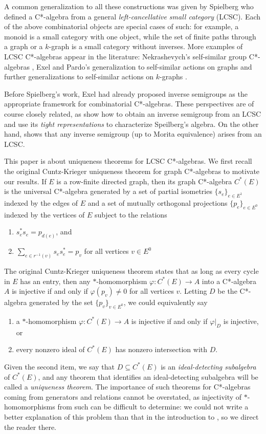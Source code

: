 \documentclass[12pt]{amsart}
\theoremstyle{definition}
\theoremstyle{remark}
\numberwithin{equation}{section}
\newcommand{\vp}{\varphi}
\begin{document}
 A common generalization to all these constructions was given by Spielberg \cite{Sp20} who defined a C*-algebra from a general {\em left-cancellative small category} (LCSC). Each of the above combinatorial objects are special cases of such: for example, a monoid is a small category with one object, while the set of finite paths through a graph or a $k$-graph is a small category without inverses. More examples of LCSC C*-algebras appear in the literature: Nekrashevych's self-similar group C*-algebras \cite{Nek09}, Exel and Pardo's generalization to self-similar actions on graphs \cite{EP17} and further generalizations to self-similar actions on $k$-graphs \cite{LY19,  LY21}.
 
 Before Spielberg's work, Exel \cite{Ex08} had already proposed inverse semigroups as the appropriate framework for combinatorial C*-algebras. These perspectives are of course closely related, as \cite{OP20} \cite{LiGarside1} show how to obtain an inverse semigroup from an LCSC and use its {\em tight representations} to characterize Speilberg's algebra. On the other hand, \cite{DGKNW20} shows that any inverse semigroup (up to Morita equivalence) arises from an LCSC. 
 
This paper is about uniqueness theorems for LCSC C*-algebras.  We first recall the original Cuntz-Krieger uniqueness theorem for graph C*-algebras to motivate our results. If $E$ is a row-finite directed graph, then its graph C*-algebra $C^*(E)$ is the universal C*-algebra generated by a set of partial isometries $\{s_e\}_{e\in E^1}$ indexed by the edges of $E$ and a set of mutually orthogonal projections $\{p_e\}_{e\in E^0}$ indexed by the vertices of $E$ subject to the relations
\begin{enumerate}
	\item[(CK1)] $s_e^*s_e = p_{d(e)}$, and
	\item[(CK2)] $\sum_{e\in r^{-1}(v)} s_es_e^* = p_v$ for all vertices $v\in E^0$
\end{enumerate} 

The original Cuntz-Krieger uniqueness theorem \cite{KPR98} states that as long as every cycle in $E$ has an entry, then any $*$-homomorphism $\vp:C^*(E)\to A$ into a C*-algebra $A$ is injective if and only if $\vp(p_v)\neq 0$ for all vertices $v$. Letting $D$ be the C*-algebra generated by the set $\{p_v\}_{v\in E^0}$, we could equivalently say
\begin{enumerate}
	\item a $*$-homomorphism $\vp:C^*(E)\to A$ is injective if and only if $\vp|_{D}$ is injective, or
	\item every nonzero ideal of $C^*(E)$ has nonzero intersection with $D$. 
\end{enumerate}
Given the second item, we say that $D\subseteq C^*(E)$ is an {\em ideal-detecting subalgebra} of $C^*(E)$, and any theorem that identifies an ideal-detecting subalgebra will be called a {\em uniqueness theorem}. The importance of such theorems for C*-algebras coming from generators and relations cannot be overstated, as injectivity of $*$-homomorphisms from such can be difficult to determine: we could not write a better explanation of this problem than that in the introduction to \cite{LS22}, so we direct the reader there.
\end{document}
